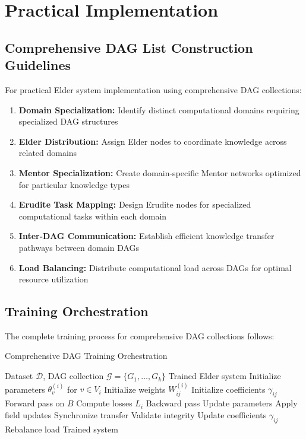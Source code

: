 \section{Practical Implementation}

\subsection{Comprehensive DAG List Construction Guidelines}

For practical Elder system implementation using comprehensive DAG collections:

\begin{enumerate}
    \item \textbf{Domain Specialization:} Identify distinct computational domains requiring specialized DAG structures
    \item \textbf{Elder Distribution:} Assign Elder nodes to coordinate knowledge across related domains
    \item \textbf{Mentor Specialization:} Create domain-specific Mentor networks optimized for particular knowledge types
    \item \textbf{Erudite Task Mapping:} Design Erudite nodes for specialized computational tasks within each domain
    \item \textbf{Inter-DAG Communication:} Establish efficient knowledge transfer pathways between domain DAGs
    \item \textbf{Load Balancing:} Distribute computational load across DAGs for optimal resource utilization
\end{enumerate}

\subsection{Training Orchestration}

The complete training process for comprehensive DAG collections follows:

\begin{algorithm}[H]
\caption{Comprehensive DAG Training Orchestration}
\begin{algorithmic}[1]
\REQUIRE Dataset $\mathcal{D}$, DAG collection $\mathcal{G} = \{G_1, \ldots, G_k\}$
\ENSURE Trained Elder system
    \STATE Initialize parameters $\theta_v^{(i)}$ for $v \in V_i$
    \STATE Initialize weights $W_{ij}^{(i)}$
\ENDFOR
\STATE Initialize coefficients $\gamma_{ij}$
        \STATE Forward pass on $B$
        \STATE Compute losses $L_i$
        \STATE Backward pass
        \STATE Update parameters
        \STATE Apply field updates
        \STATE Synchronize transfer
    \ENDFOR
    \STATE Validate integrity
    \STATE Update coefficients $\gamma_{ij}$
    \STATE Rebalance load
\ENDFOR
\RETURN Trained system
\end{algorithmic}
\end{algorithm}

